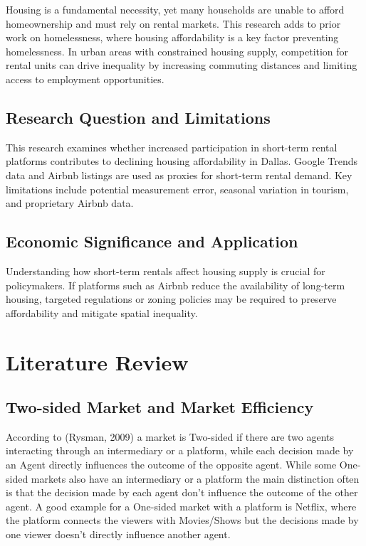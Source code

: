 \documentclass[Department of Economics]{AEA}
\begin{document}
Housing is a fundamental necessity, yet many households are unable to
afford homeownership and must rely on rental markets. This research adds
to prior work on homelessness, where housing affordability is a key
factor preventing homelessness. In urban areas with constrained housing
supply, competition for rental units can drive inequality by increasing
commuting distances and limiting access to employment opportunities.

\subsection{Research Question and
Limitations}\label{research-question-and-limitations}

This research examines whether increased participation in short-term
rental platforms contributes to declining housing affordability in
Dallas. Google Trends data and Airbnb listings are used as proxies for
short-term rental demand. Key limitations include potential measurement
error, seasonal variation in tourism, and proprietary Airbnb data.

\subsection{Economic Significance and
Application}\label{economic-significance-and-application}

Understanding how short-term rentals affect housing supply is crucial
for policymakers. If platforms such as Airbnb reduce the availability of
long-term housing, targeted regulations or zoning policies may be
required to preserve affordability and mitigate spatial inequality.

\section{Literature Review}\label{literature-review}

\subsection{Two-sided Market and Market
Efficiency}\label{two-sided-market-and-market-efficiency}

According to (Rysman, 2009) a market is Two-sided if there are two
agents interacting through an intermediary or a platform, while each
decision made by an Agent directly influences the outcome of the
opposite agent. While some One-sided markets also have an intermediary
or a platform the main distinction often is that the decision made by
each agent don't influence the outcome of the other agent. A good
example for a One-sided market with a platform is Netflix, where the
platform connects the viewers with Movies/Shows but the decisions made
by one viewer doesn't directly influence another agent.
\end{document}
